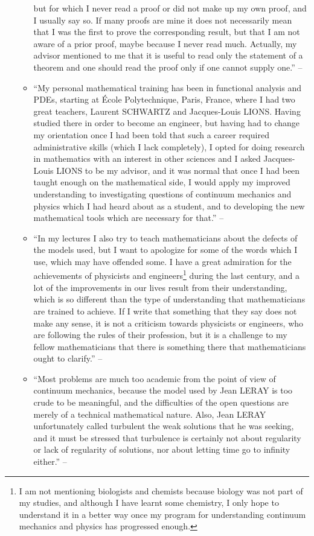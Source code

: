 \documentclass[oneside]{book}
\numberwithin{equation}{section}
\begin{document}
\begin{enumerate}
\begin{itemize}
but for which I never read a proof or did not make up my own proof, and I usually say so. If many proofs are mine it does not necessarily mean that I was the first to prove the corresponding result, but that I am not aware of a prior proof, maybe because I never read much. Actually, my advisor mentioned to me that it is useful to read only the statement of a theorem and one should read the proof only if one cannot supply one.'' -- \cite[Preface, pp. xii--xiii]{Tartar2006}
		\item ``My personal mathematical training has been in functional analysis and PDEs, starting at \'Ecole Polytechnique, Paris, France, where I had two great teachers, Laurent SCHWARTZ and Jacques-Louis LIONS. Having studied there in order to become an engineer, but having had to change my orientation once I had been told that such a career required administrative skills (which I lack completely), I opted for doing research in mathematics with an interest in other sciences and I asked Jacques-Louis LIONS to be my advisor, and it was normal that once I had been taught enough on the mathematical side, I would apply my improved understanding to investigating questions of continuum mechanics and physics which I had heard about as a student, and to developing the new mathematical tools which are necessary for that.'' -- \cite[Preface, p. xiii]{Tartar2006}
		\item ``In my lectures I also try to teach mathematicians about the defects of the models used, but I want to apologize for some of the words which I use, which may have offended some. I have a great admiration for the achievements of physicists and engineers\footnote{I am not mentioning biologists and chemists because biology was not part of my studies, and although I have learnt some chemistry, I only hope to understand it in a better way once my program for understanding continuum mechanics and physics has progressed enough.} during the last century, and a lot of the improvements in our lives result from their understanding, which is so different than the type of understanding that mathematicians are trained to achieve. If I write that something that they say does not make any sense, it is not a criticism towards physicists or engineers, who are following the rules of their profession, but it is a challenge to my fellow mathematicians that there is something there that mathematicians ought to clarify.'' -- \cite[Preface, p. xiii]{Tartar2006}
		\item ``Most problems are much too academic from the point of view of continuum mechanics, because the model used by Jean LERAY is too crude to be meaningful, and the difficulties of the open questions are merely of a technical mathematical nature. Also, Jean LERAY unfortunately called turbulent the weak solutions that he was seeking, and it must be stressed that turbulence is certainly not about regularity or lack of regularity of solutions, nor about letting time go to infinity either.'' -- \cite[Introduction, p. xv]{Tartar2006}

\end{itemize}
\end{enumerate}
\end{document}
